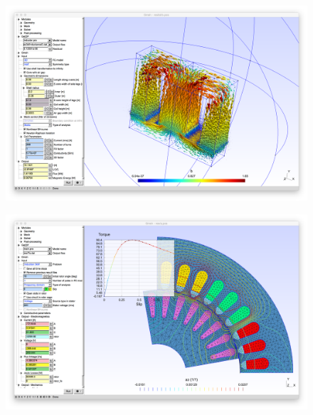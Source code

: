 \documentclass[12pt]{beamer}
\begin{document}
\begin{frame}{}
	\begin{figure}
		\centering
		\hspace*{-2.5em}\href{https://gitlab.onelab.info/doc/models/wikis/Inductor}{\includegraphics[width=1.2\linewidth]{Inductor_screenshot2}}
		\label{fig:inductorscreenshot2}
	\end{figure}
\end{frame}

\begin{frame}{}
	\begin{figure}
		\centering
		\hspace*{-2.5em}\href{https://gitlab.onelab.info/doc/models/wikis/Electric-machines}{\includegraphics[width=1.2\linewidth]{Electric-machines_screenshot2}}
	\end{figure}
\end{frame}
\end{document}
